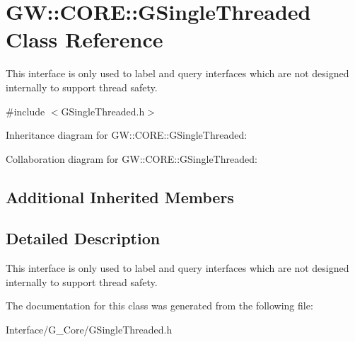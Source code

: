 \hypertarget{classGW_1_1CORE_1_1GSingleThreaded}{}\section{GW\+:\+:C\+O\+RE\+:\+:G\+Single\+Threaded Class Reference}
\label{classGW_1_1CORE_1_1GSingleThreaded}


This interface is only used to label and query interfaces which are not designed internally to support thread safety.  




{\ttfamily \#include $<$G\+Single\+Threaded.\+h$>$}



Inheritance diagram for GW\+:\+:C\+O\+RE\+:\+:G\+Single\+Threaded\+:


Collaboration diagram for GW\+:\+:C\+O\+RE\+:\+:G\+Single\+Threaded\+:
\subsection*{Additional Inherited Members}


\subsection{Detailed Description}
This interface is only used to label and query interfaces which are not designed internally to support thread safety. 

The documentation for this class was generated from the following file\+:\begin{DoxyCompactItemize}
\item 
Interface/\+G\+\_\+\+Core/G\+Single\+Threaded.\+h\end{DoxyCompactItemize}
